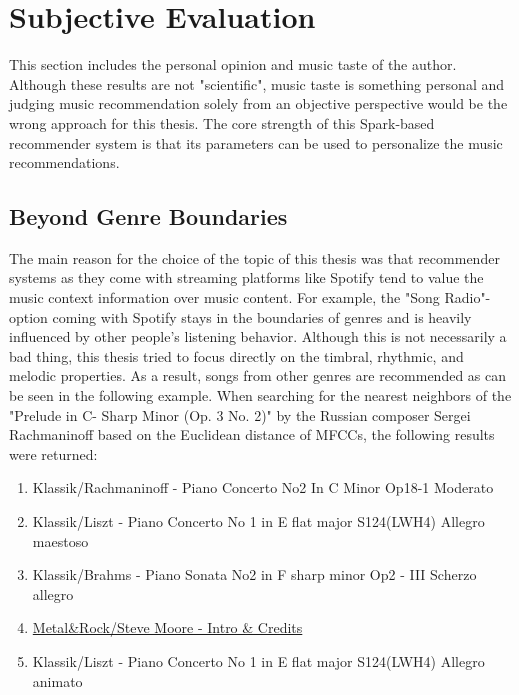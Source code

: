 \section{Subjective Evaluation}

This section includes the personal opinion and music taste of the author. Although these results are not "scientific", music taste is something personal and judging music recommendation solely from an objective perspective would be the wrong approach for this thesis. The core strength of this Spark-based recommender system is that its parameters can be used to personalize the music recommendations. 

\subsection{Beyond Genre Boundaries}

The main reason for the choice of the topic of this thesis was that recommender systems as they come with streaming platforms like Spotify tend to value the music context information over music content. For example, the "Song Radio"- option coming with Spotify stays in the boundaries of genres and is heavily influenced by other people's listening behavior. Although this is not necessarily a bad thing, this thesis tried to focus directly on the timbral, rhythmic, and melodic properties. As a result, songs from other genres are recommended as can be seen in the following example. 
\noindent When searching for the nearest neighbors of the "Prelude in C- Sharp Minor (Op. 3 No. 2)" by the Russian composer Sergei Rachmaninoff based on the Euclidean distance of MFCCs, the following results were returned: 

\begin{enumerate}
	\setlength\itemsep{-0.5em}
	\item Klassik/Rachmaninoff - Piano Concerto No2 In C Minor Op18-1 Moderato
	\item Klassik/Liszt - Piano Concerto No 1 in E flat major S124(LWH4) Allegro maestoso
	\item Klassik/Brahms - Piano Sonata No2 in F sharp minor Op2 - III Scherzo allegro
	\item \underline{Metal\&Rock/Steve Moore - Intro \& Credits}
	\item Klassik/Liszt - Piano Concerto No 1 in E flat major S124(LWH4) Allegro animato
\end{enumerate}

